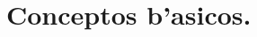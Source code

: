 \documentclass[a4paper,openright,12pt]{report}
\numberwithin{equation}{section} %
\begin{document}
\chapter{Conceptos b'asicos.}
\end{document}
